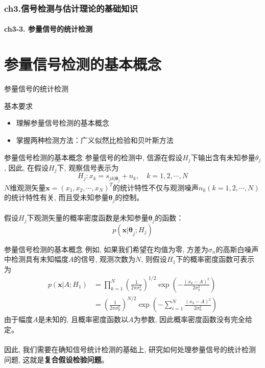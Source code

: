 \begin{frame}[shrink]
  \frametitle{ch3.信号检测与估计理论的基础知识}
  \framesubtitle{ch3-3. 参量信号的统计检测}
  \tableofcontents[hideallsubsections]
\end{frame}

\section{参量信号检测的基本概念}

\begin{frame}{参量信号的统计检测}
\begin{block}{基本要求}
	\begin{itemize}
		\setlength{\itemsep}{.5cm}
		\item 理解参量信号检测的基本概念
		\item 掌握两种检测方法：广义似然比检验和贝叶斯方法		
	\end{itemize}
\end{block}
\end{frame}

\begin{frame}[shrink]{参量信号检测的基本概念}
参量信号的检测中, 信源在假设$H_j$下输出含有未知参量$\theta_j$, 因此, 在假设$H_j$下, 观察信号表示为
\[ H_j: x_k=s_{jk|\bm{\theta}_j} + n_k,\quad k=1,2,\cdots,N \]
$N$维观测矢量$\bm{x}=(x_1,x_2,\cdots,x_N)^T$的统计特性不仅与观测噪声$n_k(k=1,2,\cdots,N)$的统计特性有关, 而且受未知参量$\bm{\theta}_j$的控制。\\
~\\
假设$H_j$下观测矢量的概率密度函数是未知参量$\bm{\theta}_j$的函数：
\[ p(\bm{x|\theta}_j; H_j)\]
\end{frame}

\begin{frame}[shrink]{参量信号检测的基本概念}
例如, 如果我们希望在均值为零, 方差为$\sigma_n$的高斯白噪声中检测具有未知幅度$A$的信号, 观测次数为$N$, 则假设$H_1$下的概率密度函数可表示为
\begin{align*}
 p(\bm{x}|A;H_1)&=\prod_{k=1}^{N}\left(\frac{1}{2\pi\sigma_n^2}\right)^{1/2}\exp\left(-\frac{(x_k-A)^2}{2\sigma_n^2}\right)\\
 &=\left(\frac{1}{2\pi\sigma_n^2}\right)^{N/2}\exp\left(-\sum_{i=1}^{N}\frac{(x_k-A)^2}{2\sigma_n^2}\right)
\end{align*}
由于幅度$A$是未知的, 且概率密度函数以$A$为参数, 因此概率密度函数没有完全给定。\\
~\\
因此, 我们需要在确知信号统计检测的基础上, 研究如何处理参量信号的统计检测问题, 这就是\textbf{复合假设检验问题}。
\end{frame}

